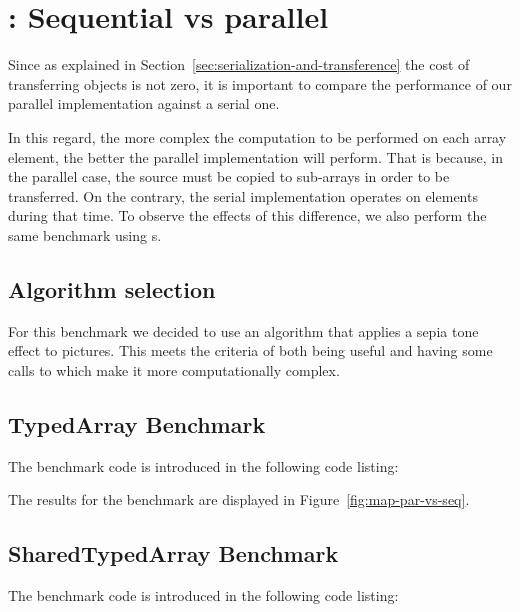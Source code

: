 \section{: Sequential vs parallel}

Since as explained in Section~\ref{sec:serialization-and-transference} the cost of transferring objects is not zero, it is important to compare the performance of our parallel implementation against a serial one.

In this regard, the more complex the computation to be performed on each array element, the better the parallel implementation will perform. That is because, in the parallel case, the source \ttarray{} must be copied to sub-arrays in order to be transferred. On the contrary, the serial implementation operates on elements during that time. To observe the effects of this difference, we also perform the same benchmark using \tstarray{}s.

\subsection{Algorithm selection}
For this benchmark we decided to use an algorithm that applies a sepia tone effect to pictures. This meets the criteria of both being useful and having some calls to  which make it more computationally complex.

\subsection{TypedArray Benchmark}
The benchmark code is introduced in the following code listing:


The results for the benchmark are displayed in Figure~\ref{fig:map-par-vs-seq}.

\subsection{SharedTypedArray Benchmark}
The benchmark code is introduced in the following code listing:

